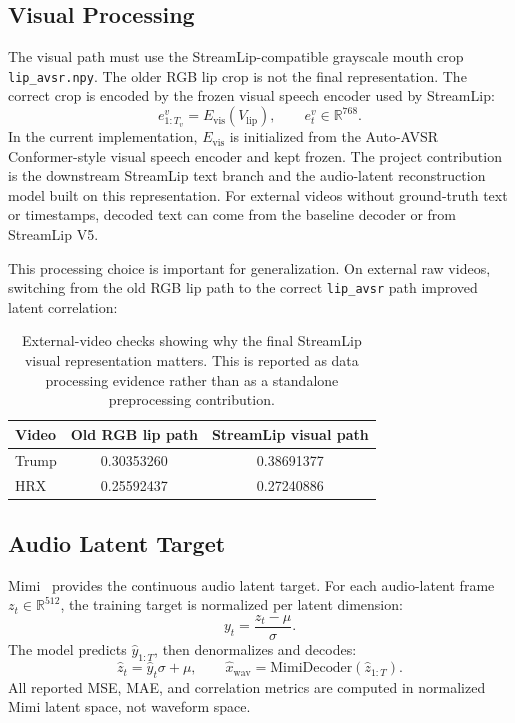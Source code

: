 \documentclass{article}
\begin{document}
\subsection{Visual Processing}

The visual path must use the StreamLip-compatible grayscale mouth crop
\texttt{lip\_avsr.npy}. The older RGB lip crop is not the final representation.
The correct crop is encoded by the frozen visual speech encoder used by
StreamLip:
\begin{equation}
    e^{v}_{1:T_v} = E_{\mathrm{vis}}(V_{\mathrm{lip}}),
    \qquad e^{v}_t \in \mathbb{R}^{768}.
\end{equation}
In the current implementation, $E_{\mathrm{vis}}$ is initialized from the Auto-AVSR~\cite{ma2023autoavsr}
Conformer-style visual speech encoder and kept frozen.
The project contribution is the downstream StreamLip text branch and the
audio-latent reconstruction model built on this representation. For external
videos without ground-truth text or timestamps, decoded text can come from the
baseline decoder or from StreamLip V5.

This processing choice is important for generalization. On external raw videos,
switching from the old RGB lip path to the correct \texttt{lip\_avsr} path
improved latent correlation:
\begin{table}[h]
\centering
\small
\begin{tabular}{@{}lcc@{}}
\toprule
\textbf{Video} & \textbf{Old RGB lip path} & \textbf{StreamLip visual path} \\
\midrule
Trump & 0.30353260 & 0.38691377 \\
HRX   & 0.25592437 & 0.27240886 \\
\bottomrule
\end{tabular}
\caption{External-video checks showing why the final StreamLip visual
representation matters. This is reported as data processing evidence rather
than as a standalone preprocessing contribution.}
\label{tab:external_visual}
\end{table}

\subsection{Audio Latent Target}

Mimi~\cite{defossez2024moshi} provides the continuous audio latent target. For each audio-latent frame
$z_t \in \mathbb{R}^{512}$, the training target is normalized per latent
dimension:
\begin{equation}
    y_t = \frac{z_t - \mu}{\sigma}.
\end{equation}
The model predicts $\hat{y}_{1:T}$, then denormalizes and decodes:
\begin{equation}
    \hat{z}_t = \hat{y}_t \sigma + \mu, \qquad
    \hat{x}_{\mathrm{wav}} = \mathrm{MimiDecoder}(\hat{z}_{1:T}).
\end{equation}
All reported MSE, MAE, and correlation metrics are computed in normalized Mimi
latent space, not waveform space.
\end{document}

